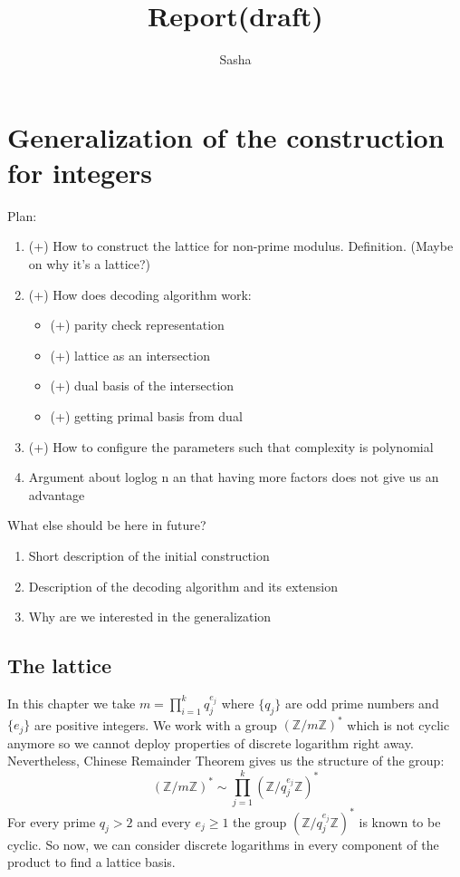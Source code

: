 \documentclass[12pt]{article}
\title{Report(draft)}
\author{ Sasha }
\newcommand{\ZZ}{\mathbb{Z}}
\begin{document}
\maketitle

\section{Generalization of the construction for integers}
Plan:
\begin{enumerate}
    \item (+) How to construct the lattice for non-prime modulus. Definition. (Maybe on why it's a lattice?)
    \item (+) How does decoding algorithm work:
    \begin{itemize}
        \item (+) parity check representation
        \item (+) lattice as an intersection
        \item (+) dual basis of the intersection
        \item (+) getting primal basis from dual
    \end{itemize}
    \item (+) How to configure the parameters such that complexity is polynomial
    \item Argument about loglog n an that having more factors does not give us an advantage
\end{enumerate}

What else should be here in future?
\begin{enumerate}
    \item Short description of the initial construction
    \item Description of the decoding algorithm and its extension
    \item Why are we interested in the generalization
\end{enumerate}

\subsection{The lattice}
In this chapter we take $m = \prod_{i=1}^{k} q_{j}^{e_{j}}$ where $\{q_{j}\}$ are odd prime numbers and $\{e_{j}\}$ are positive integers. We work with a group $(\ZZ/m\ZZ)^*$ which is not cyclic anymore so we cannot deploy properties of discrete logarithm right away. Nevertheless, Chinese Remainder Theorem gives us the structure of the group:
\begin{equation}
    (\ZZ/m\ZZ)^* \sim \prod_{j=1}^{k}(\ZZ/q_{j}^{e_{j}}\ZZ)^*
\end{equation}
For every prime $q_{j} > 2$ and every $e_{j} \geq 1$ the group $(\ZZ/q_{j}^{e_{j}}\ZZ)^*$ is known to be cyclic. So now, we can consider discrete logarithms in every component of the product to find a lattice basis.
\end{document}
